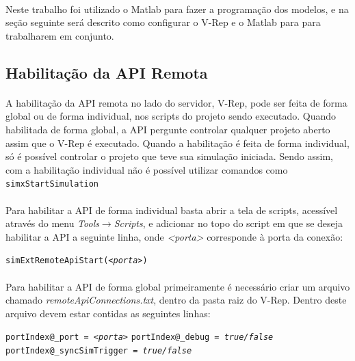 \paragraph{}
Neste trabalho foi utilizado o Matlab para fazer a programação dos modelos, e na seção seguinte será descrito como configurar o V-Rep e o Matlab para para trabalharem em conjunto.

\subsection{Habilitação da API Remota}
\paragraph{}
A habilitação da API remota no lado do servidor, V-Rep, pode ser feita de forma global ou de forma individual, nos scripts do projeto sendo executado. Quando habilitada de forma global, a API pergunte controlar qualquer projeto aberto assim que o V-Rep é executado. Quando a habilitação é feita de forma individual, só é possível controlar o projeto que teve sua simulação iniciada. Sendo assim, com a habilitação individual não é possível utilizar comandos como \texttt{simxStartSimulation}

\paragraph{}
Para habilitar a API de forma individual basta abrir a tela de scripts, acessível através do menu \emph{Tools$\rightarrow$Scripts}, e adicionar no topo do script em que se deseja habilitar a API a seguinte linha, onde \emph{<porta>} corresponde à porta da conexão:

\begin{flushleft}
	\texttt{simExtRemoteApiStart(\emph{<porta>})}
\end{flushleft}

\paragraph{}
Para habilitar a API de forma global primeiramente é necessário criar um arquivo chamado \emph{remoteApiConnections.txt}, dentro da pasta raiz do V-Rep. Dentro deste arquivo devem estar contidas as seguintes linhas:

\begin{flushleft}
	\texttt{portIndex@\_port = \emph{<porta>}} \newline
	\texttt{portIndex@\_debug = \emph{true/false}} \newline
	\texttt{portIndex@\_syncSimTrigger = \emph{true/false}}
\end{flushleft}

